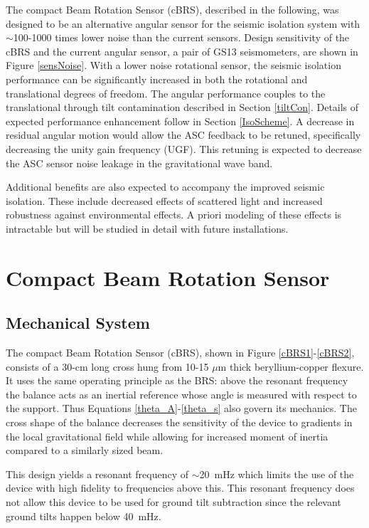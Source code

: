\documentclass [12pt, proquest]{uwthesis}[2019]
\begin{document}
The compact Beam Rotation Sensor (cBRS), described in the following, was designed to be an alternative angular sensor for the seismic isolation system with $\sim$100-1000 times lower noise than the current sensors. Design sensitivity of the cBRS and the current angular sensor, a pair of GS13 seismometers, are shown in Figure \ref{sensNoise}. With a lower noise rotational sensor, the seismic isolation performance can be significantly increased in both the rotational and translational degrees of freedom. The angular performance couples to the translational through tilt contamination described in Section \ref{tiltCon}. Details of expected performance enhancement follow in Section \ref{IsoScheme}. A decrease in residual angular motion would allow the ASC feedback to be retuned, specifically decreasing the unity gain frequency (UGF). This retuning is expected to decrease the ASC sensor noise leakage in the gravitational wave band.

Additional benefits are also expected to accompany the improved seismic isolation. These include decreased effects of scattered light and increased robustness against environmental effects. A priori modeling of these effects is intractable but will be studied in detail with future installations.


\section{Compact Beam Rotation Sensor} \label{cBRSSec}
\subsection{Mechanical System}

The compact Beam Rotation Sensor (cBRS), shown in Figure \ref{cBRS1}-\ref{cBRS2}, consists of a 30-cm long cross hung from 10-15 $\mu$m thick beryllium-copper flexure. It uses the same operating principle as the BRS: above the resonant frequency the balance acts as an inertial reference whose angle is measured with respect to the support. Thus Equations \ref{theta_A}-\ref{theta_s} also govern its mechanics. The cross shape of the balance decreases the sensitivity of the device to gradients in the local gravitational field while allowing for increased moment of inertia compared to a similarly sized beam. 

This design yields a resonant frequency of $\sim$20~mHz which limits the use of the device with high fidelity to frequencies above this. This resonant frequency does not allow this device to be used for ground tilt subtraction since the relevant ground tilts happen below 40~mHz. 
\end{document}

